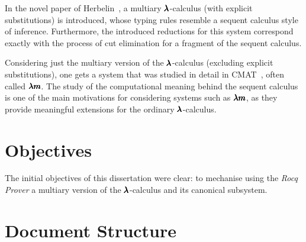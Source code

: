 In the novel paper of Herbelin~\cite{Herbelin1994}, a multiary $\pmb{\lambda}$-calculus (with explicit substitutions) is introduced, whose typing rules resemble a sequent calculus style of inference.
Furthermore, the introduced reductions for this system correspond exactly with the process of cut elimination for a fragment of the sequent calculus.

Considering just the multiary version of the $\pmb{\lambda}$-calculus (excluding explicit substitutions), one gets a system that was studied in detail in CMAT~\cite{JCESLuis}, often called $\pmb{\lambda m}$.
The study of the computational meaning behind the sequent calculus is one of the main motivations for considering systems such as $\pmb{\lambda m}$, as they provide meaningful extensions for the ordinary $\pmb{\lambda}$-calculus.


\section{Objectives}
The initial objectives of this dissertation were clear: to mechanise using the \textit{Rocq Prover} a multiary version of the $\pmb{\lambda}$-calculus and its canonical subsystem.


\section{Document Structure}

